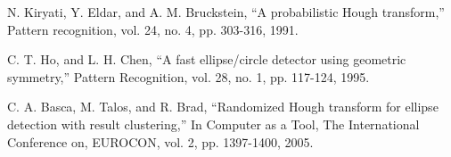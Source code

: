\documentclass[12pt,a4paper]{article}
\numberwithin{equation}{section}
\numberwithin{figure}{section}
\theoremstyle{definition}
\theoremstyle{theorem}
\theoremstyle{definition}
\begin{document}
\begin{thebibliography}{99}
\begin{LTRitems}
N. Kiryati, Y. Eldar, and A. M. Bruckstein, “A probabilistic Hough transform,” Pattern recognition, vol. 24, no. 4, pp. 303-316, 1991.

C. T. Ho, and L. H. Chen, “A fast ellipse/circle detector using geometric symmetry,” Pattern Recognition, vol. 28, no. 1, pp. 117-124, 1995.

C. A. Basca, M. Talos, and R. Brad, “Randomized Hough transform for ellipse detection with result clustering,” In Computer as a Tool, The International Conference on, EUROCON, vol. 2, pp. 1397-1400, 2005.


\end{LTRitems}

\end{thebibliography}
\end{document}
